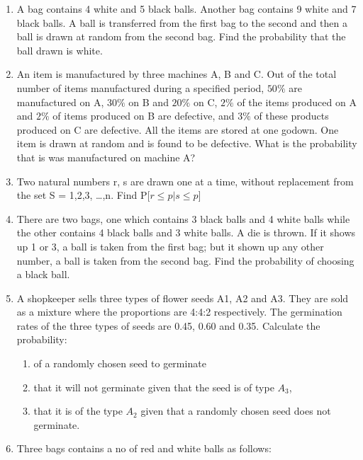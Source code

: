 \begin{enumerate}
\solution
\\
%
\item A bag contains 4 white and 5 black balls. Another bag contains 9 white and 7 black balls. A ball is transferred from the first bag to the second and then a ball is drawn at random from the second bag. Find the probability that the ball drawn is white.
\\
%
\item An item is manufactured by three machines A, B and C. Out of the total number of items manufactured during a specified period, $50\%$ are manufactured on A, $30\%$ on B and $20\%$ on C, $2\%$ of the items produced on A and $2\%$ of items produced on B are defective, and $3\%$ of these products produced on C are defective. All the items are stored at one godown. One item is drawn at random and is found to be defective. What is the probability that is was manufactured on machine A?
\solution
\\
%
\item Two natural numbers r, s are drawn one at a time, without replacement from
the set S = {1,2,3, \ldots,n}. Find P[$r\le p|s\le p$]
%
\item There are two bags, one which contains 3 black balls and 4 white balls while the other contains 4 black balls and 3 white balls. A die is thrown. If it shows up 1 or 3, a ball is taken from the first bag; but it shown up any other number, a ball is taken from the second bag. Find the probability of choosing a black ball.
\\
%
\item A shopkeeper sells three types of flower seeds A1, A2 and A3. They are sold as a mixture where the proportions are 4:4:2 respectively. The germination rates of the three types of seeds are 0.45, 0.60 and 0.35. Calculate the probability:
\begin{enumerate}
\item of a randomly chosen seed to germinate
\item that it will not germinate given that the seed is of type $A_3$,
\item that it is of the type $A_2$ given that a randomly chosen seed does not germinate.
\end{enumerate}
%
\item Three bags contains a no of red and white balls as follows:

\end{enumerate}
